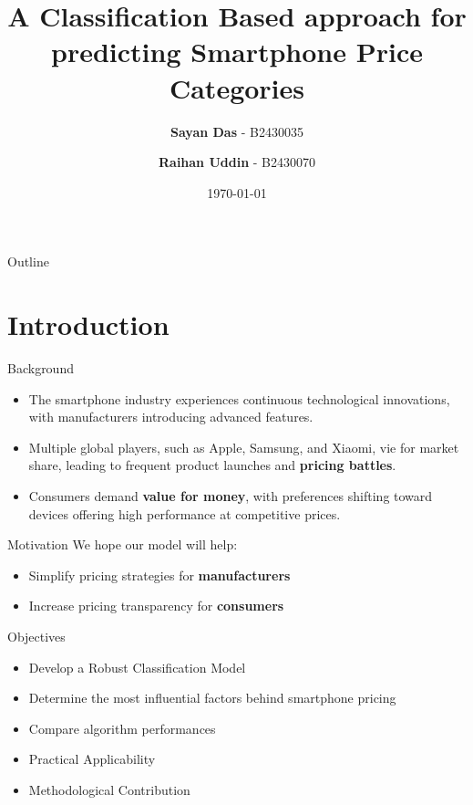 \documentclass[14pt, aspectratio=169]{beamer}
\title{A Classification Based approach for predicting Smartphone Price Categories}
\author{\textbf{Sayan Das} - B2430035 \and \textbf{Raihan Uddin} - B2430070}
\date{\today}
\begin{document}
\maketitle

\begin{frame}{Outline}
  \tableofcontents
\end{frame}



\section{Introduction}
\begin{frame}{Background}
    \begin{itemize}
      \item The smartphone industry experiences continuous technological innovations, with manufacturers introducing advanced features.
      \item Multiple global players, such as Apple, Samsung, and Xiaomi, vie for market share, leading to frequent product launches and \textbf{pricing battles}.
      \item Consumers demand \textbf{value for money}, with preferences shifting toward devices offering high performance at competitive prices.
  \end{itemize}
\end{frame}
\begin{frame}{Motivation}
  We hope our model will help:
  \vspace{1.25em}
  \begin{itemize}
	\setlength\itemsep{1em}
    \item<1-> Simplify pricing strategies for \textbf{manufacturers}
    \item<2-> Increase pricing transparency for \textbf{consumers}
  \end{itemize}
\end{frame}
\begin{frame}{Objectives}
  \begin{itemize}
	\setlength\itemsep{0.75em}
    \item<1-> Develop a Robust Classification Model
    \item<2-> Determine the most influential factors behind smartphone pricing
    \item<3-> Compare algorithm performances
    \item<4-> Practical Applicability
    \item<5-> Methodological Contribution
  \end{itemize}
\end{frame}
\end{document}
